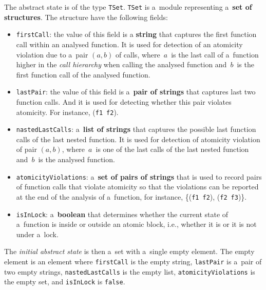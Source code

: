 The abstract state is of the type \texttt{TSet}. \texttt{TSet} is a~module
representing a~\textbf{set of structures}. The structure have the following
fields:
\begin{itemize}
    \item
        \texttt{firstCall}: the value of this field is a \textbf{string}
        that captures the first function call within an analysed function.
        It is used for detection of an atomicity violation due to a~pair
        $ (a, b) $ of calls, where~$ a $~is the last call of a~function
        higher in the \emph{call hierarchy} when calling the analysed
        function and~$ b $~is the first function call of the analysed
        function.

    \item
        \texttt{lastPair}: the value of this field is a~\textbf{pair of
        strings} that captures last two function calls. And it is used
        for detecting whether this pair violates atomicity. For instance,
        (\texttt{f1}~\texttt{f2}).

    \item
        \texttt{nastedLastCalls}: a~\textbf{list of strings} that captures
        the possible last function calls of the last nested function.
        It is used for detection of atomicity violation of pair $ (a, b) $,
        where~$ a $~is one of the last calls of the last nested function
        and~$ b $~is the analysed function.

    \item
        \texttt{atomicityViolations}: a~\textbf{set of pairs of strings}
        that is used to record pairs of function calls that violate atomicity
        so that the violations can be reported at the end of the
        analysis of a~function, for instance, \{(\texttt{f1}~\texttt{f2}),
        (\texttt{f2}~\texttt{f3})\}.

    \item
        \texttt{isInLock}: a~\textbf{boolean} that determines
        whether the current state of a~function is inside or outside an
        atomic block, i.e., whether it is or it is not under a~lock.
\end{itemize}
The \emph{initial abstract state} is then a~set with a~single empty element.
The empty element is an element where \texttt{firstCall} is the empty
string, \texttt{lastPair} is a~pair of two empty strings,
\texttt{nastedLastCalls} is the empty list, \texttt{atomicityViolations} is
the empty set, and \texttt{isInLock} is \texttt{false}.

